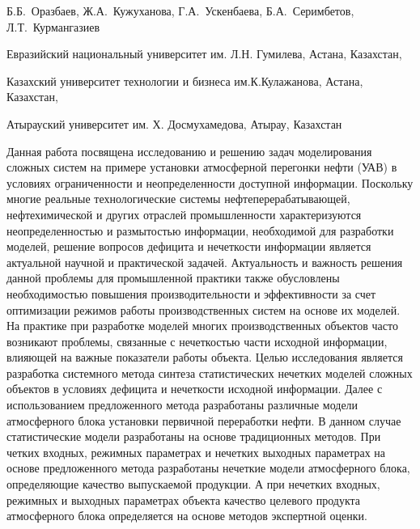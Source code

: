 
\begin{header}

Б.Б.~Оразбаев,
Ж.А.~Кужуханова\envelope,
Г.А.~Ускенбаева,
Б.А.~Серимбетов,
Л.Т.~Курмангазиев
\end{header}

\begin{affil}
Евразийский национальный университет им. Л.Н. Гумилева, Астана, Казахстан,

Казахский университет технологии и бизнеса им.К.Кулажанова, Астана, Казахстан,

Атырауский университет им. Х. Досмухамедова, Атырау, Казахстан

\end{affil}

Данная работа посвящена исследованию и решению задач моделирования
сложных систем на примере установки атмосферной перегонки нефти (УАВ) в
условиях ограниченности и неопределенности доступной информации.
Поскольку многие реальные технологические системы нефтеперерабатывающей,
нефтехимической и других отраслей промышленности характеризуются
неопределенностью и размытостью информации, необходимой для разработки
моделей, решение вопросов дефицита и нечеткости информации является
актуальной научной и практической задачей. Актуальность и важность
решения данной проблемы для промышленной практики также обусловлены
необходимостью повышения производительности и эффективности за счет
оптимизации режимов работы производственных систем на основе их моделей.
На практике при разработке моделей многих производственных объектов
часто возникают проблемы, связанные с нечеткостью части исходной
информации, влияющей на важные показатели работы объекта. Целью
исследования является разработка системного метода синтеза
статистических нечетких моделей сложных объектов в условиях дефицита и
нечеткости исходной информации. Далее с использованием предложенного
метода разработаны различные модели атмосферного блока установки
первичной переработки нефти. В данном случае статистические модели
разработаны на основе традиционных методов. При четких входных, режимных
параметрах и нечетких выходных параметрах на основе предложенного метода
разработаны нечеткие модели атмосферного блока, определяющие качество
выпускаемой продукции. А при нечетких входных, режимных и выходных
параметрах объекта качество целевого продукта атмосферного блока
определяется на основе методов экспертной оценки.

